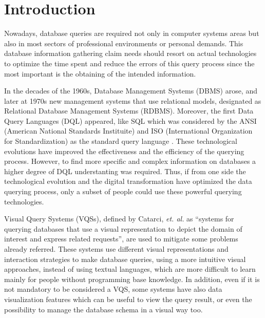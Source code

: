 \newcommand{\novathesis}{\emph{novathesis}}
\newcommand{\novathesisclass}{\texttt{novathesis.cls}}


\chapter{Introduction}
\label{cha:introduction}
Nowadays, database queries are required not only in computer systems areas but also in most sectors of professional environments or personal demands. This database information gathering claim needs should resort on actual technologies to optimize the time spent and reduce the errors of this query process since the most important is the obtaining of the intended information.

In the decades of the 1960s, Database Management Systems (DBMS) arose, and later at 1970s new management systems that use relational models, designated as Relational Database Management Systems (RDBMS). Moreover, the first Data Query Languages (DQL) appeared, like SQL \cite{sequel_aStructuredEnglishQueryLanguage} which was considered by the ANSI (American National Standards Instituite) and ISO (International Organization for Standardization) as the standard query language \cite{databaseManagementSystems}. These technological evolutions have improved the effectiveness and the efficiency of the querying process. However, to find more specific and complex information on databases  a higher degree of DQL understanting was required. Thus, if from one side the technological evolution and the digital transformation have optimized the data querying process, only a subset of people could use these powerful querying technologies.

Visual Query Systems (VQSs), defined by Catarci, \textit{et. al.} \cite{visualQuerySystemsForDatabases_aSurvey} as “systems for querying databases that use a visual representation to depict the domain of interest and express related requests”, are used to mitigate some problems already referred. These systems use different visual representations and interaction strategies to make database queries, using a more intuitive visual approaches, instead of using textual languages, which are more difficult to learn mainly for people without programming base knowledge. In addition, even if it is not mandatory to be considered a VQS, some systems have also data visualization features which can be useful to view the query result, or even the possibility to manage the database schema in a visual way too.

